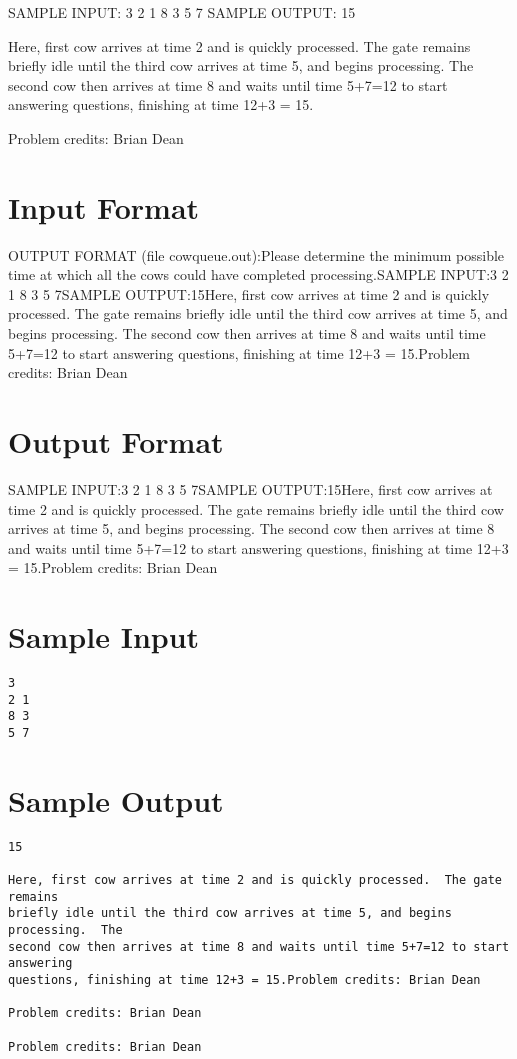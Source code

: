 \documentclass[12pt]{article}
\begin{document}
SAMPLE INPUT:
3
2 1
8 3
5 7
SAMPLE OUTPUT: 
15

Here, first cow arrives at time 2 and is quickly processed.  The gate remains
briefly idle until the third cow arrives at time 5, and begins processing.  The
second cow then arrives at time 8 and waits until time 5+7=12 to start answering
questions, finishing at time 12+3 = 15.


Problem credits: Brian Dean



\section*{Input Format}
OUTPUT FORMAT (file cowqueue.out):Please determine the minimum possible time at which all the cows could have
completed processing.SAMPLE INPUT:3
2 1
8 3
5 7SAMPLE OUTPUT:15Here, first cow arrives at time 2 and is quickly processed.  The gate remains
briefly idle until the third cow arrives at time 5, and begins processing.  The
second cow then arrives at time 8 and waits until time 5+7=12 to start answering
questions, finishing at time 12+3 = 15.Problem credits: Brian Dean

\section*{Output Format}
SAMPLE INPUT:3
2 1
8 3
5 7SAMPLE OUTPUT:15Here, first cow arrives at time 2 and is quickly processed.  The gate remains
briefly idle until the third cow arrives at time 5, and begins processing.  The
second cow then arrives at time 8 and waits until time 5+7=12 to start answering
questions, finishing at time 12+3 = 15.Problem credits: Brian Dean

\section*{Sample Input}
\begin{verbatim}
3
2 1
8 3
5 7
\end{verbatim}

\section*{Sample Output}
\begin{verbatim}
15

Here, first cow arrives at time 2 and is quickly processed.  The gate remains
briefly idle until the third cow arrives at time 5, and begins processing.  The
second cow then arrives at time 8 and waits until time 5+7=12 to start answering
questions, finishing at time 12+3 = 15.Problem credits: Brian Dean

Problem credits: Brian Dean

Problem credits: Brian Dean
\end{verbatim}
\end{document}
